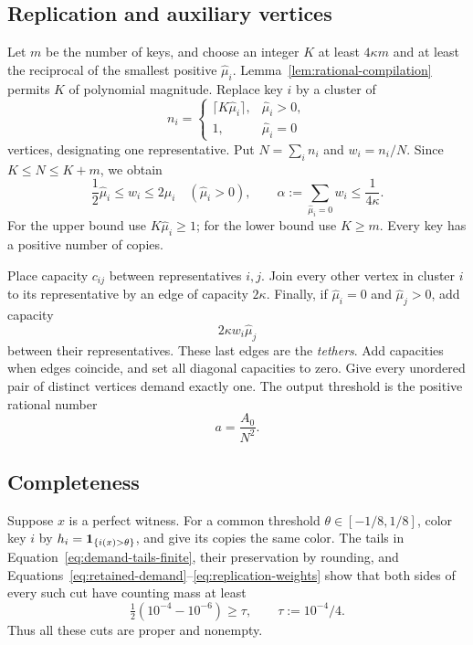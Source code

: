 \subsection{Replication and auxiliary vertices}

Let $m$ be the number of keys, and choose an integer $K$ at least
$4\kappa m$ and at least the reciprocal of the smallest positive
$\widehat\mu_i$.  Lemma~\ref{lem:rational-compilation} permits $K$ of
polynomial magnitude.  Replace key $i$ by a cluster of
\[
 n_i=\begin{cases}
 \lceil K\widehat\mu_i\rceil,&\widehat\mu_i>0,\\
 1,&\widehat\mu_i=0
 \end{cases}
\]
vertices, designating one representative.  Put $N=\sum_i n_i$ and
$w_i=n_i/N$.  Since $K\le N\le K+m$, we obtain
\begin{equation}\label{eq:replication-weights}
 \frac12\widehat\mu_i\le w_i\le2\widehat\mu_i
 \quad(\widehat\mu_i>0),\qquad
 \alpha:=\sum_{\widehat\mu_i=0}w_i\le\frac1{4\kappa}.
\end{equation}
For the upper bound use $K\widehat\mu_i\ge1$; for the lower bound use
$K\ge m$.  Every key has a positive number of copies.

Place capacity $c_{ij}$ between representatives $i,j$.  Join every other
vertex in cluster $i$ to its representative by an edge of capacity
$2\kappa$.  Finally, if $\widehat\mu_i=0$ and $\widehat\mu_j>0$, add capacity
\[
 2\kappa w_i\widehat\mu_j
\]
between their representatives.  These last edges are the \emph{tethers}.
Add capacities when edges coincide, and set all diagonal capacities to
zero.  Give every unordered pair of distinct vertices demand exactly one.
The output threshold is the positive rational number
\begin{equation}\label{eq:final-threshold}
 a=\frac{A_0}{N^2}.
\end{equation}

\subsection{Completeness}

Suppose $x$ is a perfect witness.  For a common threshold
$\theta\in[-1/8,1/8]$, color key $i$ by
$h_i=\mathbf 1_{\{i(x)>\theta\}}$, and give its copies the same color.
The tails in Equation~\eqref{eq:demand-tails-finite}, their preservation by
rounding, and Equations~\eqref{eq:retained-demand}--\eqref{eq:replication-weights}
show that both sides of every such cut have counting mass at least
\[
 \tfrac12(10^{-4}-10^{-6})\ge\tau,\qquad
 \tau:=10^{-4}/4.
\]
Thus all these cuts are proper and nonempty.

